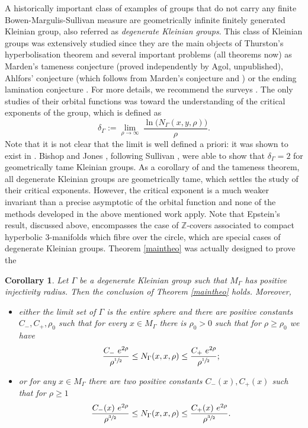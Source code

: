 \documentclass[JEP,XML,SOM,Unicode,NoFloatCountersInSection,published]{cedram}
\theoremstyle{plain}
\newtheorem{corollary}[equation]{Corollary}
\theoremstyle{definition}
\newcommand{\ZZ}{\mathbb{Z}}
\newcommand{\limi}[1]{\underset{#1}{\lim}}
\begin{document}
A historically important class of examples of groups that do not carry any finite Bowen-Margulis-Sullivan measure are geometrically infinite finitely generated Kleinian group, also referred as \emph{degenerate Kleinian groups}. This class of Kleinian groups was extensively studied since they are the main objects of Thurston's hyperbolisation theorem \cite{livremcmumu,livreotal2001hyperbolization} and several important problems (all theorems now) as Marden's tameness conjecture \cite{arttamenesscalegarigabai} (proved independently by Agol, unpublished), Ahlfors' conjecture (which follows from Marden's conjecture and \cite{articlecanary}) or the ending lamination conjecture \cite{artendinglamination}. For more details, we recommend the surveys \cite{surveycanarymarden,surveyminsky}. The only studies of their orbital functions was toward the understanding of the critical exponents of the group, which is defined as
\[
\delta_{\Gamma} := \limi{\rho \to \infty} \ \frac{ \ln \big(N_{\Gamma}(x,y,\rho) \big)}{\rho}.
\]
Note that it is not clear that the limit is well defined a priori: it was shown to exist in \cite{artroblinfoncorb}. Bishop and Jones \cite{articlebishopjones,artbishopjonescriticalgeometricfiniteness}, following Sullivan \cite{articlesullivandemicylindre}, were able to show that $\delta_{\Gamma} =2$ for geometrically tame Kleinian groups. As a corollary of \cite{articlecanary} and the tameness theorem, all degenerate Kleinian groups are geometrically tame, which settles the study of their critical exponents. However, the critical exponent is a much weaker invariant than a precise asymptotic of the orbital function and none of the methods developed in the above mentioned work apply. Note that Epstein's result, discussed above, encompasses the case of $\ZZ$-covers associated to compact hyperbolic 3-manifolds which fibre over the circle, which are special cases of degenerate Kleinian groups. Theorem \ref{maintheo} was actually designed to prove the

\begin{corollary}
\label{maincor}
Let $\Gamma$ be a degenerate Kleinian group such that $M_{\Gamma}$ has positive injectivity radius. Then the conclusion of Theorem \ref{maintheo} holds. Moreover,
\begin{itemize}
\item either the limit set of $\Gamma$ is the entire sphere and there are positive constants $C_-, C_+, \rho_0$ such that for every $x \in M_{\Gamma}$ there is $\rho_0 > 0$ such that for $\rho \ge \rho_0$ we have
\[
\frac{ C_- \ e^{ 2 \rho}}{\rho^{\sfrac{1}{2}}} \le N_{\Gamma}(x,x,\rho) \le \frac{ C_+ \ e^{2 \rho}}{\rho^{\sfrac{1}{2}}} ;
\]
\item or for any $x \in M_{\Gamma}$ there are two positive constants $C_-(x), C_+(x)$ such that for $\rho \ge 1$
\[
\frac{ C_-(x) \ e^{ 2 \rho}}{\rho^{\sfrac{3}{2}}} \le N_{\Gamma}(x,x,\rho) \le \frac{ C_+(x) \ e^{2 \rho}}{\rho^{\sfrac{3}{2}}}.
\]
\end{itemize}
\end{corollary}
\end{document}
